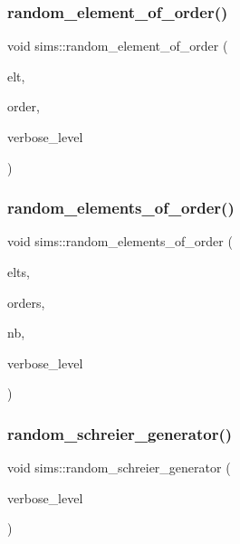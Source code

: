 \subsubsection{\texorpdfstring{random\+\_\+element\+\_\+of\+\_\+order()}{random\_element\_of\_order()}}
{\footnotesize\ttfamily void sims\+::random\+\_\+element\+\_\+of\+\_\+order (\begin{DoxyParamCaption}\item[{\mbox{\hyperlink{galois_8h_a09fddde158a3a20bd2dcadb609de11dc}{I\+NT}} $\ast$}]{elt,  }\item[{\mbox{\hyperlink{galois_8h_a09fddde158a3a20bd2dcadb609de11dc}{I\+NT}}}]{order,  }\item[{\mbox{\hyperlink{galois_8h_a09fddde158a3a20bd2dcadb609de11dc}{I\+NT}}}]{verbose\+\_\+level }\end{DoxyParamCaption})}

\mbox{\label{classsims_af5aeca809be7c10df8493c1b9ef9e980}} 
\subsubsection{\texorpdfstring{random\+\_\+elements\+\_\+of\+\_\+order()}{random\_elements\_of\_order()}}
{\footnotesize\ttfamily void sims\+::random\+\_\+elements\+\_\+of\+\_\+order (\begin{DoxyParamCaption}\item[{\mbox{\hyperlink{classvector__ge}{vector\+\_\+ge}} $\ast$}]{elts,  }\item[{\mbox{\hyperlink{galois_8h_a09fddde158a3a20bd2dcadb609de11dc}{I\+NT}} $\ast$}]{orders,  }\item[{\mbox{\hyperlink{galois_8h_a09fddde158a3a20bd2dcadb609de11dc}{I\+NT}}}]{nb,  }\item[{\mbox{\hyperlink{galois_8h_a09fddde158a3a20bd2dcadb609de11dc}{I\+NT}}}]{verbose\+\_\+level }\end{DoxyParamCaption})}

\mbox{\label{classsims_aaa77048e586c36a7639fa61ff66e0a23}} 
\subsubsection{\texorpdfstring{random\+\_\+schreier\+\_\+generator()}{random\_schreier\_generator()}}
{\footnotesize\ttfamily void sims\+::random\+\_\+schreier\+\_\+generator (\begin{DoxyParamCaption}\item[{\mbox{\hyperlink{galois_8h_a09fddde158a3a20bd2dcadb609de11dc}{I\+NT}}}]{verbose\+\_\+level }\end{DoxyParamCaption})}

